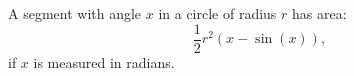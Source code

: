 A segment with angle $x$ in a circle of radius $r$ has area:
$$\frac{1}{2} r^2 (x-\sin(x)),$$ 
if $x$ is measured in radians.
